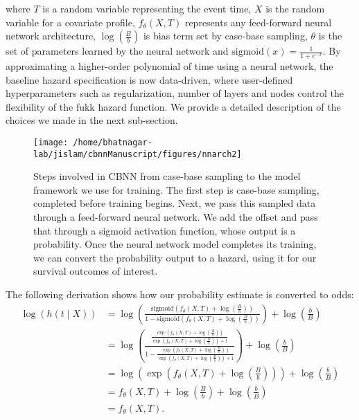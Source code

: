 \documentclass[AMA,STIX1COL,]{WileyNJD-v2}
\begin{document}
where \(T\) is a random variable representing the event time, \(X\) is
the random variable for a covariate profile, \(f_{\theta}(X, T)\)
represents any feed-forward neural network architecture,
\(\log\left(\frac{B}{b}\right)\) is bias term set by case-base sampling,
\(\theta\) is the set of parameters learned by the neural network and
\(\mathrm{sigmoid}(x)=\frac{1}{1+e^{-x}}\). By approximating a
higher-order polynomial of time using a neural network, the baseline
hazard specification is now data-driven, where user-defined
hyperparameters such as regularization, number of layers and nodes
control the flexibility of the fukk hazard function. We provide a
detailed description of the choices we made in the next sub-section.

\begin{figure}

{\centering \texttt{[image: /home/bhatnagar-lab/jislam/cbnnManuscript/figures/nnarch2]} 

}

\caption{Steps involved in CBNN from case-base sampling to the model framework we use for training. The first step is case-base sampling, completed before training begins. Next, we pass this sampled data through a feed-forward neural network. We add the offset and pass that through a sigmoid activation function, whose output is a probability. Once the neural network model completes its training, we can convert the probability output to a hazard, using it for our survival outcomes of interest.}\label{fig:NNarch}
\end{figure}

The following derivation shows how our probability estimate is converted
to odds: \begin{align*}
 \log\left( h(t \mid X) \right) &= \log\left(\frac{\mathrm{sigmoid}\left(f_{\theta}(X, T) + \log\left(\frac{B}{b}\right)\right)}{1-\mathrm{sigmoid}\left(f_{\theta}(X, T) + \log\left(\frac{B}{b}\right)\right)}\right) + \log\left(\frac{b}{B}\right) \\
 &= \log\left( \frac{\frac{\exp\left(f_{\theta}(X, T) + \log\left(\frac{B}{b}\right)\right)}{\exp\left(f_{\theta}(X, T) + \log\left(\frac{B}{b}\right)\right)+1}}{1-\frac{\exp\left(f_{\theta}(X, T) + \log\left(\frac{B}{b}\right)\right)}{\exp\left(f_{\theta}(X, T) + \log\left(\frac{B}{b}\right)\right)+1}}\right) + \log\left(\frac{b}{B}\right) \\
 &= \log\left(\exp\left( f_{\theta}(X, T) + \log\left(\frac{B}{b}\right) \right) \right) + \log\left(\frac{b}{B}\right) \\
 &= f_{\theta}(X, T) + \log\left(\frac{B}{b}\right) + \log\left(\frac{b}{B}\right) \\
&= f_{\theta}(X, T). 
\end{align*}
\end{document}
